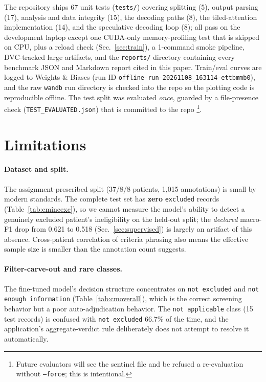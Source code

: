 \documentclass[conference]{IEEEtran}
\newcommand{\code}[1]{\texttt{\small #1}}
\begin{document}
The repository ships 67 unit tests
(\code{tests/}) covering splitting (5), output parsing (17),
analysis and data integrity (15), the decoding paths (8), the
tiled-attention implementation (14), and the speculative decoding
loop (8); all pass on the development laptop except one CUDA-only
memory-profiling test that is skipped on CPU,
plus a reload check (Sec.~\ref{sec:train}), a
1-command smoke pipeline, DVC-tracked large artifacts, and the
\code{reports/} directory containing every benchmark JSON and
Markdown report cited in this paper. Train/eval curves are
logged to Weights \& Biases (run ID
\code{offline-run-20261108\_163114-ettbmmb0}), and the raw
\code{wandb} run directory is checked into the repo so the
plotting code is reproducible offline. The test split was
evaluated \emph{once}, guarded by a file-presence check
(\code{TEST\_EVALUATED.json}) that is committed to the repo
\footnote{Future evaluators will see the sentinel file and be
refused a re-evaluation without \code{--force}; this is
intentional.}.

\section{Limitations}
\label{sec:limitations}

\paragraph*{Dataset and split.}
The assignment-prescribed split (37/8/8 patients,
1{,}015 annotations) is small by modern standards. The complete
test set has \textbf{zero} \code{excluded} records
(Table~\ref{tab:cmincexc}), so we cannot measure the model's
ability to detect a genuinely excluded patient's ineligibility
on the held-out split; the \emph{declared} macro-F1 drop from
0.621 to 0.518 (Sec.~\ref{sec:supervised}) is largely an artifact
of this absence. Cross-patient correlation of criteria phrasing
also means the effective sample size is smaller than the
annotation count suggests.

\paragraph*{Filter-carve-out and rare classes.}
The fine-tuned model's decision structure concentrates on
\code{not excluded} and \code{not enough information}
(Table~\ref{tab:cmoverall}), which is the correct screening
behavior but a poor auto-adjudication behavior. The
\code{not applicable} class (15 test records) is confused with
\code{not excluded} 66.7\% of the time, and the
application's aggregate-verdict rule deliberately does not
attempt to resolve it automatically.
\end{document}
